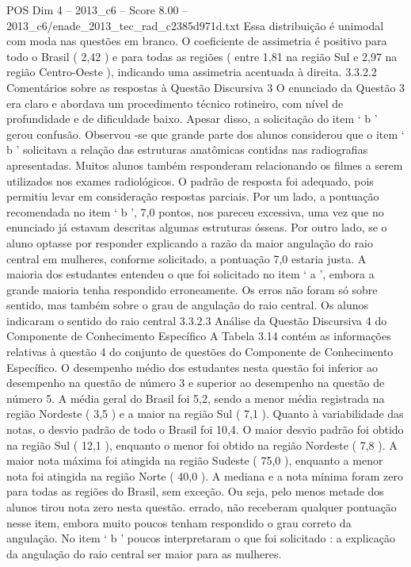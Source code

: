 \begin{textsample}{POS Dim 4 – 2013\_c6 – Score 8.00 – 2013\_c6/enade\_2013\_tec\_rad\_c2385d971d.txt}
Essa distribuição é unimodal com moda nas questões em branco.
O coeficiente de assimetria é positivo para todo o Brasil ( 2,42 ) e para todas as regiões ( entre 1,81 na região Sul e 2,97 na região Centro-Oeste ), indicando uma assimetria acentuada à direita. 3.3.2.2 Comentários sobre as respostas à Questão Discursiva 3 O enunciado da Questão 3 era claro e abordava um procedimento técnico rotineiro, com nível de profundidade e de dificuldade baixo.
Apesar disso, a solicitação do item ‘ b ’ gerou confusão.
Observou -se que grande parte dos alunos considerou que o item ‘ b ’ solicitava a relação das estruturas anatômicas contidas nas radiografias apresentadas.
Muitos alunos também responderam relacionando os filmes a serem utilizados nos exames radiológicos.
O padrão de resposta foi adequado, pois permitiu levar em consideração respostas parciais.
Por um lado, a pontuação recomendada no item ‘ b ’, 7,0 pontos, nos pareceu excessiva, uma vez que no enunciado já estavam descritas algumas estruturas ósseas.
Por outro lado, se o aluno optasse por responder explicando a razão da maior angulação do raio central em mulheres, conforme solicitado, a pontuação 7,0 estaria justa.
A maioria dos estudantes entendeu o que foi solicitado no item ‘ a ’, embora a grande maioria tenha respondido erroneamente.
Os erros não foram só sobre sentido, mas também sobre o grau de angulação do raio central.
Os alunos indicaram o sentido do raio central 3.3.2.3 Análise da Questão Discursiva 4 do Componente de Conhecimento Específico A Tabela 3.14 contém as informações relativas à questão 4 do conjunto de questões do Componente de Conhecimento Específico.
O desempenho médio dos estudantes nesta questão foi inferior ao desempenho na questão de número 3 e superior ao desempenho na questão de número 5.
A média geral do Brasil foi 5,2, sendo a menor média registrada na região Nordeste ( 3,5 ) e a maior na região Sul ( 7,1 ).
Quanto à variabilidade das notas, o desvio padrão de todo o Brasil foi 10,4.
O maior desvio padrão foi obtido na região Sul ( 12,1 ), enquanto o menor foi obtido na região Nordeste ( 7,8 ).
A maior nota máxima foi atingida na região Sudeste ( 75,0 ), enquanto a menor nota foi atingida na região Norte ( 40,0 ).
A mediana e a nota mínima foram zero para todas as regiões do Brasil, sem exceção.
Ou seja, pelo menos metade dos alunos tirou nota zero nesta questão. errado, não receberam qualquer pontuação nesse item, embora muito poucos tenham respondido o grau correto da angulação.
No item ‘ b ’ poucos interpretaram o que foi solicitado : a explicação da angulação do raio central ser maior para as mulheres.

\end{textsample}
